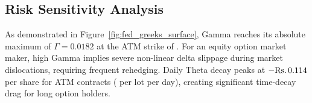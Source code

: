 \subsection{Risk Sensitivity Analysis}

As demonstrated in Figure~\ref{fig:fed_greeks_surface}, Gamma reaches its absolute maximum of $\Gamma = 0.0182$ at the ATM strike of . For an equity option market maker, high Gamma implies severe non-linear delta slippage during market dislocations, requiring frequent rehedging. Daily Theta decay peaks at $-\text{\text{Rs.}\,}0.114$ per share for ATM contracts ( per lot per day), creating significant time-decay drag for long option holders.

\clearpage
